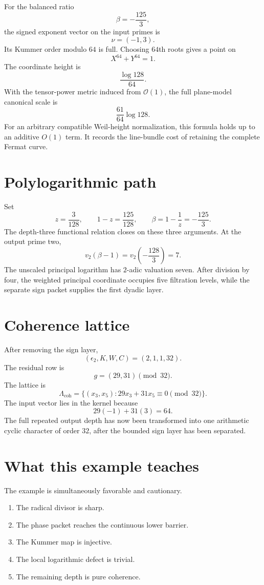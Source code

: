 For the balanced ratio
\[
 \beta=-\frac{125}{3},
\]
the signed exponent vector on the input primes is
\[
 \nu=(-1,3).
\]
Its Kummer order modulo $64$ is full. Choosing $64$th roots gives a point on
\[
 X^{64}+Y^{64}=1.
\]
The coordinate height is
\[
 \frac{\log128}{64}.
\]
With the tensor-power metric induced from $\mathcal O(1)$, the full plane-model canonical scale is
\[
 \frac{61}{64}\log128.
\]
For an arbitrary compatible Weil-height normalization, this formula holds up to an additive $O(1)$ term. It records the line-bundle cost of retaining the complete Fermat curve.

\section{Polylogarithmic path}
Set
\[
 z=\frac3{128},
 \qquad
 1-z=\frac{125}{128},
 \qquad
 \beta=1-\frac1z=-\frac{125}{3}.
\]
The depth-three functional relation closes on these three arguments. At the output prime two,
\[
 v_2(\beta-1)
 =
 v_2\left(-\frac{128}{3}\right)
 =7.
\]
The unscaled principal logarithm has $2$-adic valuation seven. After division by four, the weighted principal coordinate occupies five filtration levels, while the separate sign packet supplies the first dyadic layer.

\section{Coherence lattice}
After removing the sign layer,
\[
 (\epsilon_2,K,W,C)=(2,1,1,32).
\]
The residual row is
\[
 g=(29,31)\pmod{32}.
\]
The lattice is
\[
 \Lambda_{\mathrm{coh}}
 =
 \{(x_3,x_5):29x_3+31x_5\equiv0\pmod{32}\}.
\]
The input vector lies in the kernel because
\[
 29(-1)+31(3)=64.
\]
The full repeated output depth has now been transformed into one arithmetic cyclic character of order $32$, after the bounded sign layer has been separated.

\section{What this example teaches}
The example is simultaneously favorable and cautionary.

\begin{enumerate}[leftmargin=1.5em]
\item The radical divisor is sharp.
\item The phase packet reaches the continuous lower barrier.
\item The Kummer map is injective.
\item The local logarithmic defect is trivial.
\item The remaining depth is pure coherence.
\end{enumerate}

